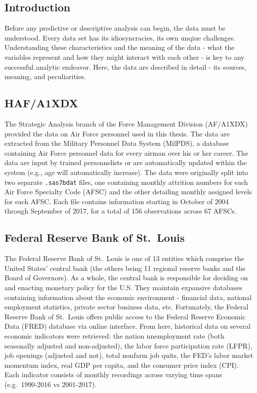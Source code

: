 \documentclass[12pt,letterpaper,toc=flat,oneside]{report}
\theoremstyle{definition}
\theoremstyle{definition}
\theoremstyle{definition}
\theoremstyle{remark}
\begin{document}
\hypertarget{introduction-1}{%
\subsection{Introduction}\label{introduction-1}}

Before any predictive or descriptive analysis can begin, the data must
be understood. Every data set has its idiosyncracies, its own unqiue
challenges. Understanding these characteristics and the meaning of the
data - what the variables represent and how they might interact with
each other - is key to any successful analytic endeavor. Here, the data
are described in detail - its sources, meaning, and peculiarities.

\hypertarget{hafa1xdx}{%
\subsection{HAF/A1XDX}\label{hafa1xdx}}

The Strategic Analysis branch of the Force Management Division
(AF/A1XDX) provided the data on Air Force personnel used in this thesis.
The data are extracted from the Military Personnel Data System (MilPDS),
a database containing Air Force personnel data for every airman over his
or her career. The data are input by trained personnelists or are
automatically updated within the system (e.g., age will automatically
increase). The data were originally split into two separate
\texttt{.sas7bdat} files, one containing monthly attrition numbers for
each Air Force Specialty Code (AFSC) and the other detailing monthly
assigned levels for each AFSC. Each file contains information starting
in October of 2004 through September of 2017, for a total of 156
observations across 67 AFSCs.

\hypertarget{federal-reserve-bank-of-st.louis}{%
\subsection{Federal Reserve Bank of
St.~Louis}\label{federal-reserve-bank-of-st.louis}}

The Federal Reserve Bank of St.~Louis is one of 13 entities which
comprise the United States' central bank (the others being 11 regional
reserve banks and the Board of Governors). As a whole, the central bank
is responsible for deciding on and enacting monetary policy for the U.S.
They maintain expansive databases containing information about the
economic environment - financial data, national employment statistics,
private sector business data, etc. Fortunately, the Federal Reserve Bank
of St.~Louis offers public access to the Federal Reserve Economic Data
(FRED) database via online interface. From here, historical data on
several economic indicators were retrieved: the nation unemployment rate
(both seasonally adjusted and non-adjusted), the labor force
participation rate (LFPR), job openings (adjusted and not), total
nonfarm job quits, the FED's labor market momentum index, real GDP per
capita, and the consumer price index (CPI). Each indicator consists of
monthly recordings across varying time spans (e.g.~1990-2016 vs
2001-2017).
\end{document}

